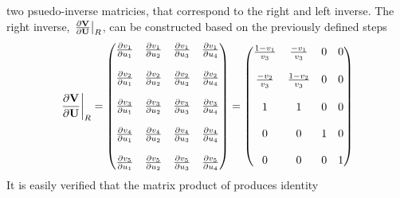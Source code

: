 \documentclass[a4paper]{report}
\begin{document}
two psuedo-inverse matricies, that correspond to the right and left inverse.
The right inverse, $\left. \frac{\partial \mathbf V}{\partial \mathbf U}\right|_{R}$, can be constructed based on the previously
defined steps
\begin{equation}
  \left. \frac{\partial \mathbf V}{\partial \mathbf U}\right|_{R} = 
  \begin{pmatrix}
    \frac{\partial v_1}{\partial u_1} & \frac{\partial v_1}{\partial u_2} & \frac{\partial v_1}{\partial u_3} & \frac{\partial v_1}{\partial u_4} \\ \\
    \frac{\partial v_2}{\partial u_1} & \frac{\partial v_2}{\partial u_2} & \frac{\partial v_2}{\partial u_3} & \frac{\partial v_2}{\partial u_4} \\ \\
    \frac{\partial v_3}{\partial u_1} & \frac{\partial v_3}{\partial u_2} & \frac{\partial v_3}{\partial u_3} & \frac{\partial v_3}{\partial u_4} \\ \\
    \frac{\partial v_4}{\partial u_1} & \frac{\partial v_4}{\partial u_2} & \frac{\partial v_4}{\partial u_3} & \frac{\partial v_4}{\partial u_4} \\ \\
    \frac{\partial v_5}{\partial u_1} & \frac{\partial v_5}{\partial u_2} & \frac{\partial v_5}{\partial u_3} & \frac{\partial v_5}{\partial u_4} 
  \end{pmatrix}
  =
  \begin{pmatrix}
    \frac{1-v_1}{v_3} & \frac{-v_1}{v_3}  & 0 & 0 \\ \\
    \frac{-v_2}{v_3}  & \frac{1-v_2}{v_3} & 0 & 0 \\ \\
    1                 & 1                 & 0 & 0 \\ \\
    0                 & 0                 & 1 & 0 \\ \\
    0                 & 0                 & 0 & 1
  \end{pmatrix}
  \label{dvdu-jac-right}
\end{equation}
It is easily verified that the matrix product of
 produces identity
\end{document}
